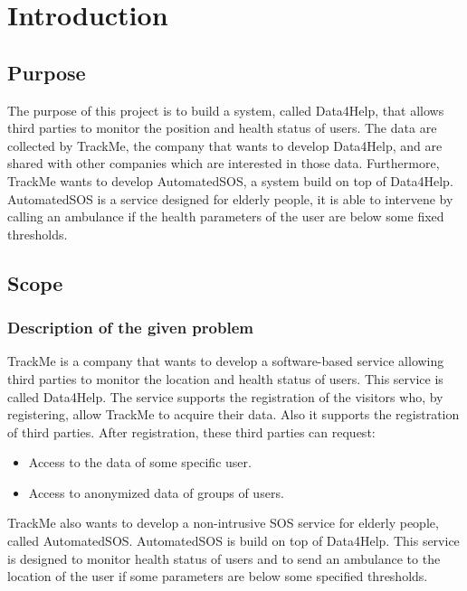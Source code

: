 \documentclass{article}
\begin{document}
\section{Introduction}
\subsection{Purpose}
The purpose of this project is to build a system, called Data4Help, that allows third parties to monitor the position and health status of users. The data are collected by TrackMe, the company that wants to develop Data4Help, and are shared with other companies which are interested in those data.
Furthermore, TrackMe wants to develop AutomatedSOS, a system build on top of Data4Help. AutomatedSOS is a service designed for elderly people, it is able to intervene by calling an ambulance if the health parameters of the user are below some fixed thresholds.
\subsection{Scope}
\subsubsection{Description of the given problem}
TrackMe is a company that wants to develop a software-based service allowing third parties to monitor the location and health status of users. This service is called Data4Help. The service supports the registration of the visitors who, by registering, allow TrackMe to acquire their data. Also it supports the registration of third parties. After registration, these third parties can request: 
\begin{itemize}
	\item Access to the data of some specific user.
	\item Access to anonymized data of groups of users.
\end{itemize}
TrackMe also wants to develop a non-intrusive SOS service for elderly people, called AutomatedSOS. AutomatedSOS is build on top of Data4Help. This service is designed to monitor health status of users and to send an ambulance to the location of the user if some parameters are below some specified thresholds. 
\end{document}
